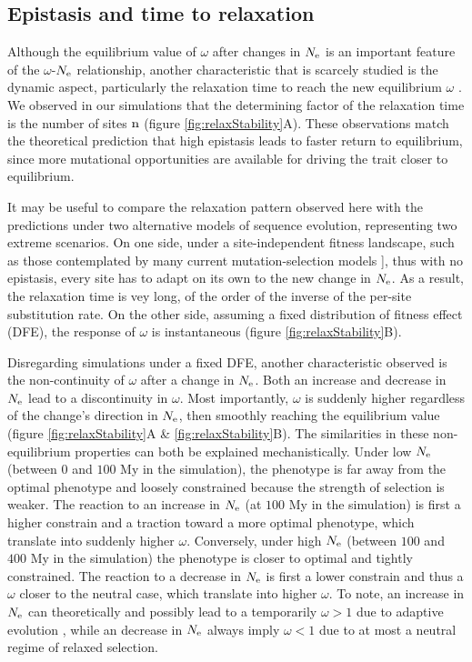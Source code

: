 \documentclass{article}
\begin{document}
	\subsection*{Epistasis and time to relaxation}
	Although the equilibrium value of $\omega$ after changes in $N_{\mathrm{e}}$ is an important feature of the $\omega$-$N_{\mathrm{e}}$ relationship, another characteristic that is scarcely studied is the dynamic aspect, particularly the relaxation time to reach the new equilibrium $\omega$ \cite{Jones2016}.
	We observed in our simulations that the determining factor of the relaxation time is the number of sites $\text{n}$ (figure \ref{fig:relaxStability}A).
	These observations match the theoretical prediction that high epistasis leads to faster return to equilibrium, since more mutational opportunities are available for driving the trait closer to equilibrium.
	
	It may be useful to compare the relaxation pattern observed here with the predictions under two alternative models of sequence evolution, representing two extreme scenarios. On one side, under a site-independent fitness landscape, such as those contemplated by many current mutation-selection models \cite{Halpern1998, Rodrigue2010}], thus with no epistasis, every site has to adapt on its own to the new change in $N_{\mathrm{e}}$. As a result, the relaxation time is vey long, of the order of the inverse of the per-site substitution rate. 	
	On the other side, assuming a fixed distribution of fitness effect (DFE), the response of $\omega$ is instantaneous (figure \ref{fig:relaxStability}B).
	
	Disregarding simulations under a fixed DFE, another characteristic observed is the non-continuity of $\omega$ after a change in $N_{\mathrm{e}}$.
	Both an increase and decrease in $N_{\mathrm{e}}$ lead to a discontinuity in $\omega$.
	Most importantly, $\omega$ is suddenly higher regardless of the change's direction in $N_{\mathrm{e}}$, then smoothly reaching the equilibrium value (figure \ref{fig:relaxStability}A \& \ref{fig:relaxStability}B).
	The similarities in these non-equilibrium properties can both be explained mechanistically.
	Under low $N_{\mathrm{e}}$ (between $0$ and $100$ My in the simulation), the phenotype is far away from the optimal phenotype and loosely constrained because the strength of selection is weaker.
	The reaction to an increase in $N_{\mathrm{e}}$ (at $100$ My in the simulation) is first a higher constrain and a traction toward a more optimal phenotype, which translate into suddenly higher $\omega$.
	Conversely, under high $N_{\mathrm{e}}$ (between $100$ and $400$ My in the simulation) the phenotype is closer to optimal and tightly constrained.
	The reaction to a decrease in $N_{\mathrm{e}}$ is first a lower constrain and thus a $\omega$ closer to the neutral case, which translate into higher $\omega$.
	To note, an increase in $N_{\mathrm{e}}$ can theoretically and possibly lead to a temporarily $\omega > 1$ due to adaptive evolution \cite{Jones2016}, while an decrease in $N_{\mathrm{e}}$ always imply $\omega < 1$ due to at most a neutral regime of relaxed selection.
	
\end{document}
